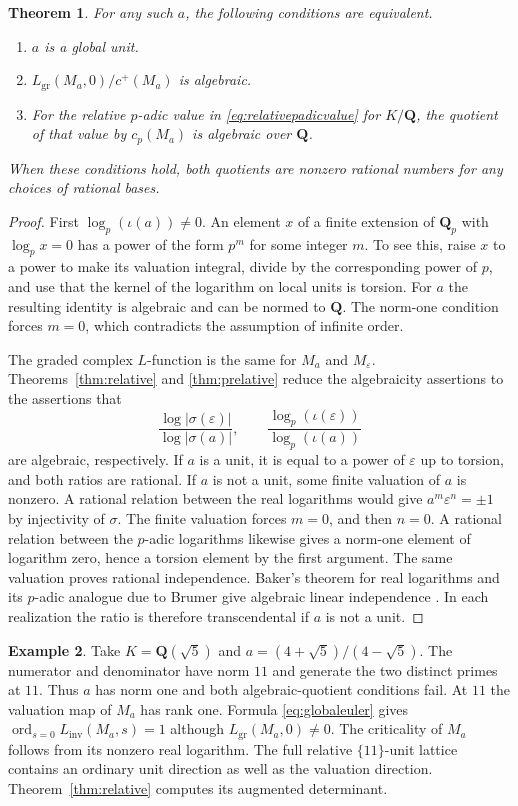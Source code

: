 \documentclass[11pt]{amsart}
\numberwithin{equation}{section}
\newtheorem{theorem}{Theorem}[section]
\theoremstyle{definition}
\newtheorem{example}[theorem]{Example}
\theoremstyle{remark}
\newcommand{\Q}{\mathbf Q}
\newcommand{\ord}{\operatorname{ord}}
\newcommand{\gr}{\operatorname{gr}}
\begin{document}
\begin{theorem}\label{thm:rigidity}
For any such $a$, the following conditions are equivalent.
\begin{enumerate}
\item $a$ is a global unit.
\item $L_{\gr}(M_a,0)/c^+(M_a)$ is algebraic.
\item For the relative $p$-adic value in
\eqref{eq:relativepadicvalue} for $K/\Q$, the quotient
of that value by $c_p(M_a)$ is algebraic over $\Q$.
\end{enumerate}
When these conditions hold, both quotients are nonzero
rational numbers for any choices of rational bases.
\end{theorem}

\begin{proof}
First $\log_p(\iota(a))\ne0$. An element $x$ of a finite
extension of $\Q_p$ with $\log_p x=0$ has a power of the
form $p^m$ for some integer $m$. To see this, raise $x$
to a power to make its valuation integral, divide by
the corresponding power of $p$, and use that the kernel
of the logarithm on local units is torsion. For $a$ the
resulting identity is algebraic and can be normed to
$\Q$. The norm-one condition forces $m=0$, which
contradicts the assumption of infinite order.

The graded complex $L$-function is the same for $M_a$ and
$M_\varepsilon$. Theorems~\ref{thm:relative} and
\ref{thm:prelative} reduce the algebraicity assertions to
the assertions that
\[
 \frac{\log|\sigma(\varepsilon)|}{\log|\sigma(a)|},
 \qquad
 \frac{\log_p(\iota(\varepsilon))}{\log_p(\iota(a))}
\]
are algebraic, respectively. If $a$ is a unit, it is
equal to a power of $\varepsilon$ up to torsion, and
both ratios are rational. If $a$ is not a unit, some
finite valuation of $a$ is nonzero. A rational relation
between the real logarithms would give $a^m\varepsilon^n=\pm1$
by injectivity of $\sigma$. The finite valuation forces
$m=0$, and then $n=0$. A rational relation between
the $p$-adic logarithms likewise gives a norm-one element
of logarithm zero, hence a torsion element by the first
argument. The same valuation proves rational independence.
Baker's theorem for real logarithms and its $p$-adic
analogue due to Brumer give algebraic linear independence
\cite{Baker,Brumer}. In each realization the ratio is
therefore transcendental if $a$ is not a unit.
\end{proof}

\begin{example}\label{ex:quadratic}
Take $K=\Q(\sqrt5)$ and $a=(4+\sqrt5)/(4-\sqrt5)$.
The numerator and denominator have norm $11$ and generate
the two distinct primes at $11$. Thus $a$ has norm one
and both algebraic-quotient conditions fail. At $11$ the
valuation map of $M_a$ has rank one. Formula
\eqref{eq:globaleuler} gives
$\ord_{s=0}L_{\mathrm{inv}}(M_a,s)=1$ although
$L_{\gr}(M_a,0)\ne0$. The criticality of $M_a$ follows
from its nonzero real logarithm. The full relative
$\{11\}$-unit lattice contains an ordinary unit direction
as well as the valuation direction. Theorem~\ref{thm:relative}
computes its augmented determinant.
\end{example}
\end{document}
